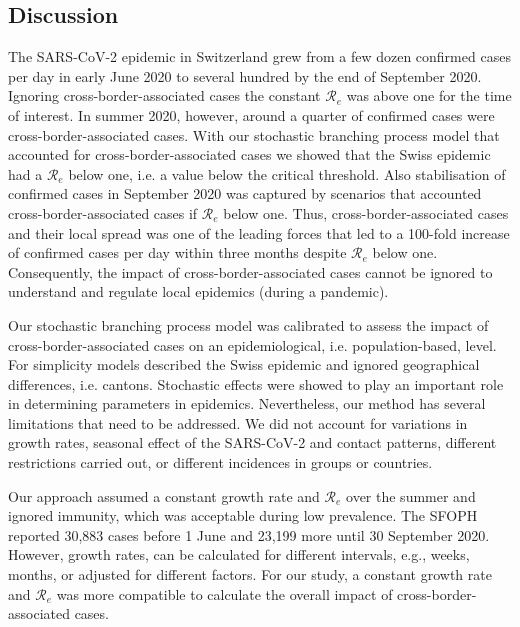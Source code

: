 \documentclass[10pt, a4paper, twoside]{article}
\begin{document}
\begin{multicols}{2}
\section{Discussion}
The SARS-CoV-2 epidemic in Switzerland grew from a few dozen confirmed cases per day in early June 2020 to several hundred by the end of September 2020.
Ignoring cross-border-associated cases the constant $\mathcal{R}_e$ was above one for the time of interest.
In summer 2020, however, around a quarter of confirmed cases were cross-border-associated cases.
With our stochastic branching process model that accounted for cross-border-associated cases we showed that the Swiss epidemic had a $\mathcal{R}_e$ below one, i.e. a value below the critical threshold.
Also stabilisation of confirmed cases in September 2020 was captured by scenarios that accounted cross-border-associated cases if $\mathcal{R}_e$ below one.
Thus, cross-border-associated cases and their local spread was one of the leading forces that led to a 100-fold increase of confirmed cases per day within three months despite $\mathcal{R}_e$ below one.
Consequently, the impact of cross-border-associated cases cannot be ignored to understand and regulate local epidemics (during a pandemic).
\break
\par
Our stochastic branching process model was calibrated to assess the impact of cross-border-associated cases on an epidemiological, i.e. population-based, level.
For simplicity models described the Swiss epidemic and ignored geographical differences, i.e. cantons.
Stochastic effects were showed to play an important role in determining parameters in epidemics.\cite{althaus_ebola_2015,riou_pattern_2020}
Nevertheless, our method has several limitations that need to be addressed.
We did not account for variations in growth rates, seasonal effect of the SARS-CoV-2 and contact patterns, different restrictions carried out, or different incidences in groups or countries.

Our approach assumed a constant growth rate and $\mathcal{R}_e$ over the summer and ignored immunity, which was acceptable during low prevalence.
The SFOPH reported 30,883 cases before 1 June and 23,199 more until 30 September 2020.
However, growth rates, can be calculated for different intervals, e.g., weeks, months, or adjusted for different factors.
For our study, a constant growth rate and $\mathcal{R}_e$ was more compatible to calculate the overall impact of cross-border-associated cases.


\end{multicols}
\end{document}
